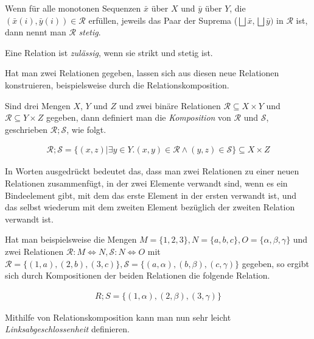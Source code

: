 \begin{mydef}
Wenn für alle monotonen Sequenzen $\bar{x}$ über $X$ und $\bar{y}$ über $Y$, die $(\bar{x}(i), \bar{y}(i)) \in \mathcal{R}$
erfüllen, jeweils das Paar der Suprema ($\bigsqcup{\bar{x}}, \bigsqcup{\bar{y}})$ in $\mathcal{R}$ ist, dann nennt man $\mathcal{R}$ \textit{stetig}.
\end{mydef}

\begin{mydef}
Eine Relation ist \textit{zulässig}, wenn sie strikt und stetig ist.
\end{mydef}

Hat man zwei Relationen gegeben, lassen sich aus diesen neue Relationen konstruieren, beispielsweise durch die Relationskomposition.

\begin{mydef}
Sind drei Mengen $X$, $Y$ und $Z$ und zwei binäre Relationen $\mathcal{R} \subseteq X \times Y$ und $\mathcal{R} \subseteq Y
\times Z$ gegeben, dann definiert man die \textit{Komposition} von $\mathcal{R}$ und $\mathcal{S}$,
geschrieben $\mathcal{R} ; \mathcal{S}$, wie folgt.

\begin{align*}
\mathcal{R} ; \mathcal{S} = \{ (x, z) | \exists y \in Y . (x, y) \in \mathcal{R} \wedge (y, z) \in \mathcal{S} \} \subseteq X \times Z
\end{align*}
\end{mydef}

In Worten ausgedrückt bedeutet das, dass man zwei Relationen zu einer neuen Relationen zusammenfügt, in der zwei Elemente
verwandt sind, wenn es ein Bindeelement gibt, mit dem das erste Element in der ersten verwandt ist, und das selbst wiederum mit
dem zweiten Element bezüglich der zweiten Relation verwandt ist.

Hat man beispielsweise die Mengen $M = \{ 1, 2, 3 \}, N = \{ a, b, c \}, O = \{ \alpha, \beta, \gamma \}$ und zwei Relationen
$\mathcal{R} : M \Leftrightarrow N, \mathcal{S} : N \Leftrightarrow O$ mit
$\mathcal{R} = \{ (1, a), (2, b), (3, c) \}, \mathcal{S} = \{ (a, \alpha), (b, \beta), (c, \gamma) \}$ gegeben, so ergibt sich
durch Kompositionen der beiden Relationen die folgende Relation.

\begin{align*}
R ; S = \{ (1, \alpha), (2, \beta), (3, \gamma) \}
\end{align*}

Mithilfe von Relationskomposition kann man nun sehr leicht \textit{Linksabgeschlossenheit} definieren.

